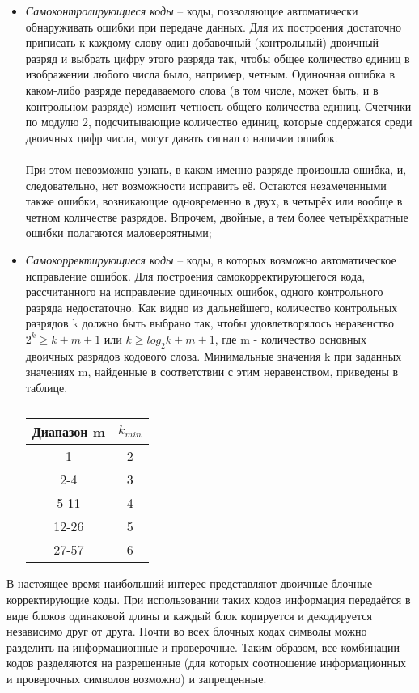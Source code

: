 \begin{itemize}
\item \emph{Самоконтролирующиеся коды} -- коды, позволяющие автоматически обнаруживать ошибки при передаче данных. Для их построения достаточно приписать к каждому слову один добавочный (контрольный) двоичный разряд и выбрать цифру этого разряда так, чтобы общее количество единиц в изображении любого числа было, например, четным. Одиночная ошибка в каком-либо разряде передаваемого слова (в том числе, может быть, и в контрольном разряде) изменит четность общего количества единиц. Счетчики по модулю 2, подсчитывающие количество единиц, которые содержатся среди двоичных цифр числа, могут давать сигнал о наличии ошибок.\\
\\При этом невозможно узнать, в каком именно разряде произошла ошибка, и, следовательно, нет возможности исправить её. Остаются незамеченными также ошибки, возникающие одновременно в двух, в четырёх или вообще в четном количестве разрядов. Впрочем, двойные, а тем более четырёхкратные ошибки полагаются маловероятными;
\item \emph{Самокорректирующиеся коды} -- коды, в которых возможно автоматическое исправление ошибок. Для построения самокорректирующегося кода, рассчитанного на исправление одиночных ошибок, одного контрольного разряда недостаточно. Как видно из дальнейшего, количество контрольных разрядов k должно быть выбрано так, чтобы удовлетворялось неравенство $2^k \ge k+m+1$ или $k \ge log_2{k+m+1}$, где m -  количество основных двоичных разрядов кодового слова. Минимальные значения k при заданных значениях m, найденные в соответствии с этим неравенством, приведены в таблице.

\begin{table}[h]
\caption{}
\begin{center}
\begin{tabular}{|c|c|}
\hline
 Диапазон m & $k_{min}$  \\
\hline
1 & 2 \\
\hline
2-4 & 3\\
\hline
5-11 & 4\\
\hline
12-26 & 5\\
\hline
27-57 & 6 \\
\hline
\end{tabular}
\end{center}
\end{table}
\end{itemize}
В настоящее время наибольший интерес представляют двоичные блочные корректирующие коды. При использовании таких кодов информация передаётся в виде блоков одинаковой длины и каждый блок кодируется и декодируется независимо друг от друга. Почти во всех блочных кодах символы можно разделить на информационные и проверочные. Таким образом, все комбинации кодов разделяются на разрешенные (для которых соотношение информационных и проверочных символов возможно) и запрещенные.\\
